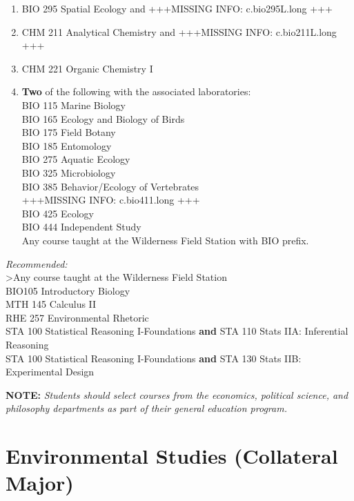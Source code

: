 \documentclass[
  letterpaper,
]{scrbook}
\providecommand{\tightlist}{%
  \setlength{\itemsep}{0pt}\setlength{\parskip}{0pt}}
\begin{document}
\begin{enumerate}
\def\labelenumi{\arabic{enumi}.}
\setcounter{enumi}{1}
\tightlist
\item
  BIO 295 Spatial Ecology and +++MISSING INFO: c.bio295L.long +++\\
\item
  CHM 211 Analytical Chemistry and +++MISSING INFO: c.bio211L.long +++\\
\item
  CHM 221 Organic Chemistry I\\
\item
  \textbf{Two} of the following with the associated laboratories:\\
  BIO 115 Marine Biology\\
  BIO 165 Ecology and Biology of Birds\\
  BIO 175 Field Botany\\
  BIO 185 Entomology\\
  BIO 275 Aquatic Ecology\\
  BIO 325 Microbiology\\
  BIO 385 Behavior/Ecology of Vertebrates\\
  +++MISSING INFO: c.bio411.long +++\\
  BIO 425 Ecology\\
  BIO 444 Independent Study\\
  Any course taught at the Wilderness Field Station with BIO prefix.
\end{enumerate}

\emph{Recommended:}\\
\textgreater Any course taught at the Wilderness Field Station\\
BIO105 Introductory Biology\\
MTH 145 Calculus II\\
RHE 257 Environmental Rhetoric\\
STA 100 Statistical Reasoning I-Foundations \textbf{and} STA 110 Stats
IIA: Inferential Reasoning\\
STA 100 Statistical Reasoning I-Foundations \textbf{and} STA 130 Stats
IIB: Experimental Design

\textbf{NOTE:} \emph{Students should select courses from the economics,
political science, and philosophy departments as part of their general
education program.}

\section{Environmental Studies (Collateral
Major)}\label{sec-environmental-studies}
\end{document}
